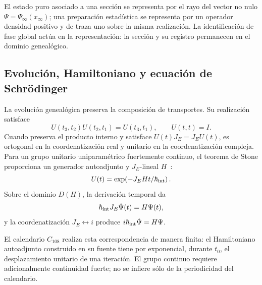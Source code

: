 \begin{principle}
\label{v:rec:realizacion_evolucion:statement:02}
El estado puro asociado a una sección se representa por el rayo del vector
no nulo \(\Psi=\Psi_\infty(x_\infty)\); una preparación estadística se
representa por un operador densidad positivo y de traza uno sobre la misma
realización. La identificación de fase global actúa en la representación:
la sección y su registro permanecen en el dominio genealógico.
\end{principle}

\subsection{Evolución, Hamiltoniano y ecuación de Schrödinger}
\label{v:rec:realizacion_evolucion:section:03}

La evolución genealógica preserva la composición de transportes. Su
realización satisface
\[
 U(t_3,t_2)U(t_2,t_1)=U(t_3,t_1),
 \qquad U(t,t)=I.
\]
Cuando preserva el producto interno y satisface
\(U(t)J_E=J_EU(t)\), es ortogonal en la coordenatización real y unitario en la coordenatización
compleja. Para un grupo unitario uniparamétrico fuertemente continuo, el
teorema de Stone proporciona un generador autoadjunto y \(J_E\)-lineal
\(H\)~\cite{Stone1932}:
\[
 U(t)=\exp\!\left(-J_E H t/\hbar_{\rm int}\right).
\]
Sobre el dominio \(D(H)\), la derivación temporal da
\begin{equation}
 \hbar_{\rm int}J_E\dot\Psi(t)=H\Psi(t),
 \label{v:rec:eq:schrodinger-genealogico-rev2}
\end{equation}
y la coordenatización \(J_E\leftrightarrow i\) produce
\(i\hbar_{\rm int}\dot\Psi=H\Psi\).

El calendario \(C_{108}\) realiza esta correspondencia de manera finita:
el Hamiltoniano autoadjunto construido en su fuente tiene por
exponencial, durante \(t_0\), el desplazamiento unitario de una iteración. El
grupo continuo requiere adicionalmente continuidad fuerte; no se infiere
sólo de la periodicidad del calendario.
